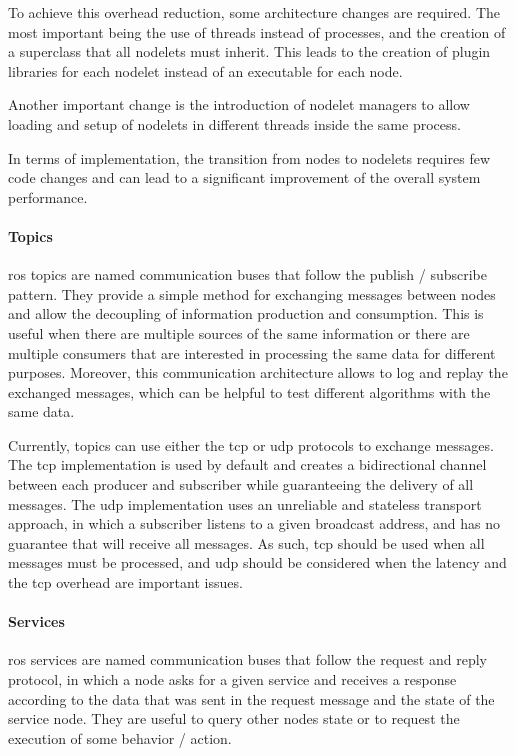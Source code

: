 To achieve this overhead reduction, some architecture changes are required. The most important being the use of threads instead of processes, and the creation of a superclass that all nodelets must inherit. This leads to the creation of plugin libraries for each nodelet instead of an executable for each node.

Another important change is the introduction of nodelet managers to allow loading and setup of nodelets in different threads inside the same process.

In terms of implementation, the transition from nodes to nodelets requires few code changes and can lead to a significant improvement of the overall system performance.


\paragraph{Topics}

\gls{ros} topics are named communication buses that follow the publish / subscribe pattern. They provide a simple method for exchanging messages between nodes and allow the decoupling of information production and consumption. This is useful when there are multiple sources of the same information or there are multiple consumers that are interested in processing the same data for different purposes. Moreover, this communication architecture allows to log and replay the exchanged messages, which can be helpful to test different algorithms with the same data.

Currently, topics can use either the \gls{tcp} or \gls{udp} protocols to exchange messages. The \gls{tcp} implementation is used by default and creates a bidirectional channel between each producer and subscriber while guaranteeing the delivery of all messages. The \gls{udp} implementation uses an unreliable and stateless transport approach, in which a subscriber listens to a given broadcast address, and has no guarantee that will receive all messages. As such, \gls{tcp} should be used when all messages must be processed, and \gls{udp} should be considered when the latency and the \gls{tcp} overhead are important issues.


\paragraph{Services}

\gls{ros} services are named communication buses that follow the request and reply protocol, in which a node asks for a given service and receives a response according to the data that was sent in the request message and the state of the service node. They are useful to query other nodes state or to request the execution of some behavior / action.


